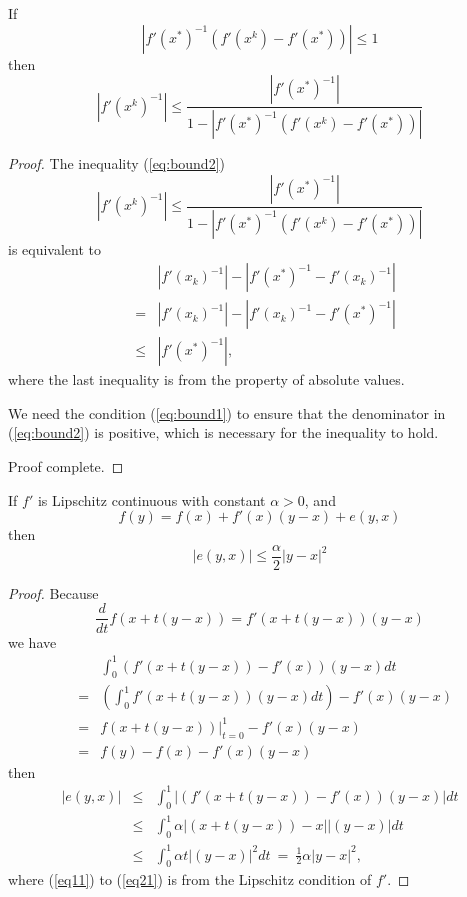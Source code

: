 \begin{lemma} \label{lemma:bound}
    If \begin{equation}
        |f'(x^*)^{-1} (f'(x^k)-f'(x^*))| \leq 1 \label{eq:bound1}
    \end{equation}
    then \begin{equation}
        |f'(x^k)^{-1}| \leq \frac{|f'(x^*)^{-1}|}{1 - |f'(x^*)^{-1} (f'(x^k)-f'(x^*))|} \label{eq:bound2}
    \end{equation}
\end{lemma}
\begin{proof}
    The inequality (\ref{eq:bound2}) \begin{equation*}
        |f'(x^k)^{-1}| \leq \frac{|f'(x^*)^{-1}|}{1 - |f'(x^*)^{-1} (f'(x^k)-f'(x^*))|}
    \end{equation*}
    is equivalent to \begin{eqnarray}
    && |f'(x_k)^{-1}|
    - |f'(x^*)^{-1} - f'(x_k)^{-1}| \nonumber
    \\
    &= & |f'(x_k)^{-1}|
    - | f'(x_k)^{-1} - f'(x^*)^{-1}| \nonumber
    \\  
    & \leq & |f'(x^*)^{-1}|, \label{eq:3}
    \end{eqnarray}
    where the last inequality is from the property of absolute values.
    \begin{note}
        We need the condition (\ref{eq:bound1}) to ensure that the denominator in (\ref{eq:bound2}) is positive, which is necessary for the inequality to hold.
    \end{note}
    Proof complete.
\end{proof}

\begin{lemma} \label{lemma:con}
    If $f'$ is Lipschitz continuous with constant $\alpha>0$, and \[
        f(y) = f(x) + f'(x)(y-x) + e(y,x)
    \]
    then \[
        |e(y,x)| \leq \frac{\alpha}{2} |y-x|^2    
    \]
\end{lemma}
\begin{proof}
    Because \[
        \frac{d}{dt} f(x+t(y-x)) = f'(x + t(y-x))(y-x)
    \]
    we have \begin{eqnarray*}
        && \int_0^1 (f'(x+t(y-x))-f'(x))(y-x)dt  \\
        & = & \left(\int_0^1 f'(x+t(y-x))(y-x)dt\right) - f'(x)(y-x)\\
        & = & f(x+t(y-x))\Bigr\rvert^{1}_{t=0} 
                - f'(x)(y-x)\\  
        & = & f(y) - f(x) - f'(x)(y-x)
    \end{eqnarray*}
    then \begin{eqnarray}
    |e(y,x)|
    & \leq & 
    \int_0^1 |(f'(x+t(y-x))-f'(x))(y-x)|dt    \label{eq11} \\
    & \leq & 
    \int_0^1 \alpha |(x+t(y-x))-x||(y-x)| dt    \label{eq21} \\
    & \leq & 
    \int_0^1 \alpha t |(y-x)|^2 dt \ = \ \boxed{\frac{1}{2} \alpha |y-x|^2}, \nonumber
\end{eqnarray}
    where (\ref{eq11}) to (\ref{eq21}) is from the Lipschitz condition of $f'$.
\end{proof}

